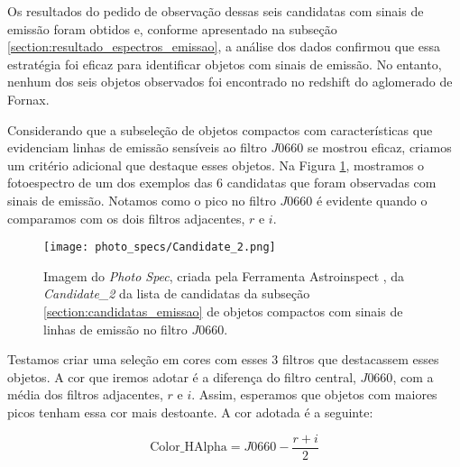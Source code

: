 Os resultados do pedido de observação dessas seis candidatas com sinais de emissão foram obtidos e, conforme apresentado na subseção \ref{section:resultado_espectros_emissao}, a análise dos dados confirmou que essa estratégia foi eficaz para identificar objetos com sinais de emissão. No entanto, nenhum dos seis objetos observados foi encontrado no redshift do aglomerado de Fornax.

Considerando que a subseleção de objetos compactos com características que evidenciam linhas de emissão sensíveis ao filtro $J0660$ se mostrou eficaz, criamos um critério adicional que destaque esses objetos. Na Figura \ref{ex_photospec_f600}, mostramos o fotoespectro de um dos exemplos das 6 candidatas que foram observadas com sinais de emissão. Notamos como o pico no filtro $J0660$ é evidente quando o comparamos com os dois filtros adjacentes, $r$ e $i$.

\begin{figure}[!ht]
    \begin{center}
    \texttt{[image: photo\_specs/Candidate\_2.png]}
    \caption[]{Imagem do \textit{Photo Spec}, criada pela Ferramenta Astroinspect \cite{astroinspect}, da \textit{Candidate\_2} da lista de candidatas da subseção \ref{section:candidatas_emissao} de objetos compactos com sinais de linhas de emissão no filtro $J0660$.}
    \label{ex_photospec_f600}
    \end{center}
\end{figure}

Testamos criar uma seleção em cores com esses 3 filtros que destacassem esses objetos. A cor que iremos adotar é a diferença do filtro central, $J0660$, com a média dos filtros adjacentes, $r$ e $i$. Assim, esperamos que objetos com maiores picos tenham essa cor mais destoante. A cor adotada é a seguinte:

\begin{equation}
    \text{Color\_HAlpha} = J0660 - \frac{r + i}{2}
    \label{equantion_halpha_color}
\end{equation}



